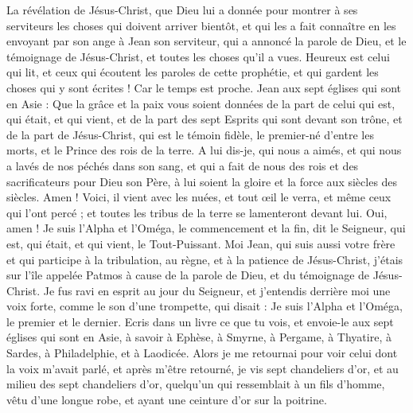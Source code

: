 \begin{multicols}{2}
\VerseOne{}La révélation de Jésus-Christ, que Dieu lui a donnée pour montrer à ses serviteurs les choses qui doivent arriver bientôt, et qui les a fait connaître en les envoyant par son ange à Jean son serviteur,
qui a annoncé la parole de Dieu, et le témoignage de Jésus-Christ, et toutes les choses qu'il a vues.
Heureux est celui qui lit, et ceux qui écoutent les paroles de cette prophétie, et qui gardent les choses qui y sont écrites ! Car le temps est proche.
Jean aux sept églises qui sont en Asie : Que la grâce et la paix vous soient données de la part de celui qui est, qui était, et qui vient, et de la part des sept Esprits qui sont devant son trône,
et de la part de Jésus-Christ, qui est le témoin fidèle, le premier-né d'entre les morts, et le Prince des rois de la terre.
A lui dis-je, qui nous a aimés, et qui nous a lavés de nos péchés dans son sang, et qui a fait de nous des rois et des sacrificateurs pour Dieu son Père, à lui soient la gloire et la force aux siècles des siècles. Amen !
Voici, il vient avec les nuées, et tout œil le verra, et même ceux qui l'ont percé ; et toutes les tribus de la terre se lamenteront devant lui. Oui, amen !
Je suis l'Alpha et l'Oméga, le commencement et la fin, dit le Seigneur, qui est, qui était, et qui vient, le Tout-Puissant.
Moi Jean, qui suis aussi votre frère et qui participe à la tribulation, au règne, et à la patience de Jésus-Christ, j'étais sur l'île appelée Patmos à cause de la parole de Dieu, et du témoignage de Jésus-Christ.
Je fus ravi en esprit au jour du Seigneur, et j'entendis derrière moi une voix forte, comme le son d'une trompette,
qui disait : Je suis l'Alpha et l'Oméga, le premier et le dernier. Ecris dans un livre ce que tu vois, et envoie-le aux sept églises qui sont en Asie, à savoir à Ephèse, à Smyrne, à Pergame, à Thyatire, à Sardes, à Philadelphie, et à Laodicée.
Alors je me retournai pour voir celui dont la voix m'avait parlé, et après m'être retourné, je vis sept chandeliers d'or,
et au milieu des sept chandeliers d'or, quelqu'un qui ressemblait à un fils d'homme, vêtu d'une longue robe, et ayant une ceinture d'or sur la poitrine.

\end{multicols}

